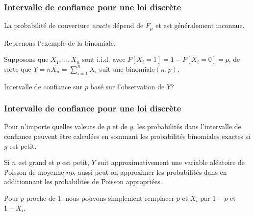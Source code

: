 \documentclass[t,usepdftitle=false]{beamer}
\begin{document}
\begin{frame}
\frametitle{Intervalle de confiance pour une loi discrète}

La probabilité de couverture \emph{exacte} dépend de $F_\mu$
et est généralement inconnue.

\mbox{}

Reprenons l'exemple de la binomiale.

\mbox{}

Supposons que $X_1,\ldots,X_n$ sont i.i.d. avec $P[X_i = 1] = 1 - P[X_i = 0] = p$, de sorte que $Y = n \overline{X_n} = \sum_{i=1}^n X_i$ suit une binomiale$(n,p)$.

\mbox{}

Intervalle de confiance sur $p$ basé sur l'observation de $Y$?

\end{frame}

\begin{frame}
\frametitle{Intervalle de confiance pour une loi discrète}

Pour n'importe quelles valeurs de $p$ et de $y$, les probabilités dans l'intervalle de confiance peuvent être calculées en sommant les probabilités binomiales exactes si $y$ est petit.

\mbox{}

Si $n$ est grand et $p$ est petit, $Y$ suit approximativement une variable aléatoire de Poisson de moyenne $np$, aussi peut-on approximer les probabilités dans en additionnant les probabilités de Poisson appropriées.

\mbox{}

Pour $p$ proche de 1, nous pouvons  simplement remplacer $p$ et $X_i$ par $1-p$ et $1-X_i$.

\end{frame}
\end{document}
